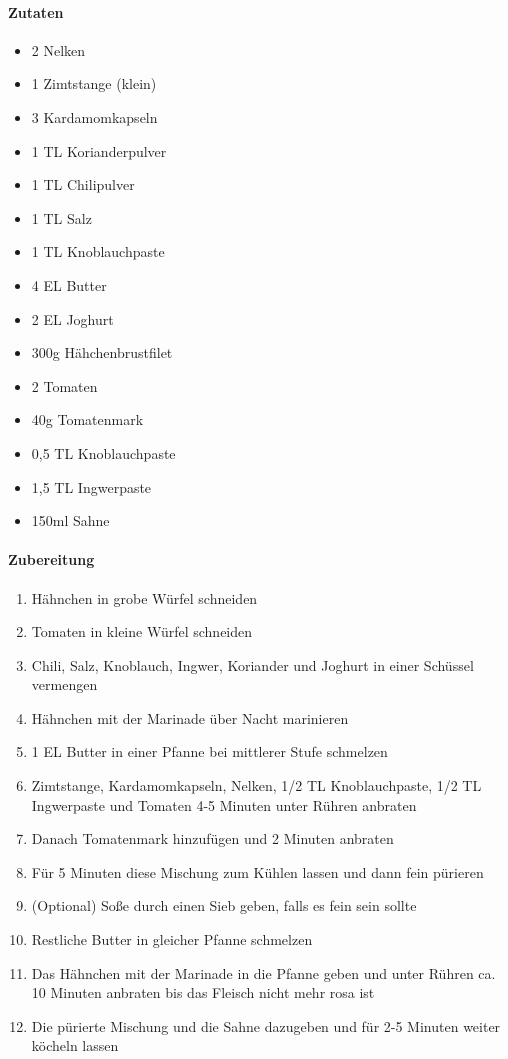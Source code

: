 \clearpage
{}
\paragraph{Zutaten}
\begin{itemize}[noitemsep]
	\item 2 Nelken
	\item 1 Zimtstange (klein)
	\item 3 Kardamomkapseln
	\item 1 TL Korianderpulver
	\item 1 TL Chilipulver
	\item 1 TL Salz
	\item 1 TL Knoblauchpaste
	\item 4 EL Butter
	\item 2 EL Joghurt
	\item 300g Hähchenbrustfilet 
	\item 2 Tomaten
	\item 40g Tomatenmark
	\item 0,5 TL Knoblauchpaste
	\item 1,5 TL Ingwerpaste
	\item 150ml Sahne
\end{itemize}
\paragraph{Zubereitung}
\begin{enumerate}[noitemsep]
	\item Hähnchen in grobe Würfel schneiden
	\item Tomaten in kleine Würfel schneiden
	\item Chili, Salz, Knoblauch, Ingwer, Koriander und Joghurt in einer Schüssel vermengen 
	\item Hähnchen mit der Marinade über Nacht marinieren
	\item 1 EL Butter in einer Pfanne bei mittlerer Stufe schmelzen
	\item Zimtstange, Kardamomkapseln, Nelken, 1/2 TL Knoblauchpaste, 1/2 TL Ingwerpaste und Tomaten 4-5 Minuten unter Rühren anbraten
	\item Danach Tomatenmark hinzufügen und 2 Minuten anbraten
	\item Für 5 Minuten diese Mischung zum Kühlen lassen und dann fein pürieren
	\item (Optional) Soße durch einen Sieb geben, falls es fein sein sollte
	\item Restliche Butter in gleicher Pfanne schmelzen
	\item Das Hähnchen mit der Marinade in die Pfanne geben und unter Rühren ca. 10 Minuten anbraten bis das Fleisch nicht mehr rosa ist
	\item Die pürierte Mischung und die Sahne dazugeben und für 2-5 Minuten weiter köcheln lassen
\end{enumerate}
